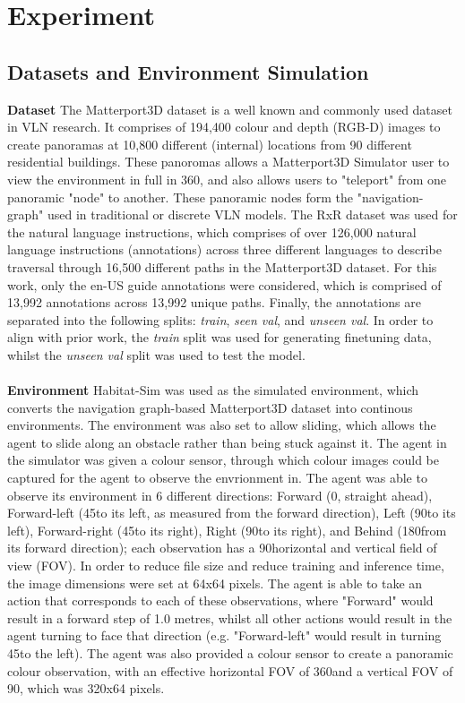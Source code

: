 \documentclass{svproc}
\begin{document}
\section{Experiment}
\subsection{Datasets and Environment Simulation}
    \textbf{Dataset}  The Matterport3D \cite{Matterport3D} dataset is a well known and commonly used dataset in VLN research. It comprises of 194,400 colour and depth (RGB-D) images to create panoramas at 10,800 different (internal) locations from 90 different residential buildings. These panoromas allows a Matterport3D Simulator user to view the environment in full in 360\textdegree, and also allows users to "teleport" from one panoramic "node" to another. These panoramic nodes form the "navigation-graph" used in traditional or discrete VLN models.
    The RxR dataset was used for the natural language instructions, which comprises of over 126,000 natural language instructions (annotations) across three different languages to describe traversal through 16,500 different paths in the Matterport3D dataset. For this work, only the en-US guide annotations were considered, which is comprised of 13,992 annotations across 13,992 unique paths. Finally, the annotations are separated into the following splits: \textit{train}, \textit{seen val}, and \textit{unseen val}. In order to align with prior work, the \textit{train} split was used for generating finetuning data, whilst the \textit{unseen val} split was used to test the model.
    \\ \\
    \textbf{Environment}  Habitat-Sim \cite{habitat19iccv, szot2021habitat, puig2023habitat3} was used as the simulated environment, which converts the navigation graph-based Matterport3D dataset into continous environments. The environment was also set to allow sliding, which allows the agent to slide along an obstacle rather than being stuck against it. The agent in the simulator was given a colour sensor, through which colour images could be captured for the agent to observe the envrionment in. The agent was able to observe its environment in 6 different directions: Forward (0\textdegree, straight ahead), Forward-left (45\textdegree to its left, as measured from the forward direction), Left (90\textdegree to its left), Forward-right (45\textdegree to its right), Right (90\textdegree to its right), and Behind (180\textdegree from its forward direction); each observation has a 90\textdegree horizontal and vertical field of view (FOV). In order to reduce file size and reduce training and inference time, the image dimensions were set at 64x64 pixels. The agent is able to take an action that corresponds to each of these observations, where "Forward" would result in a forward step of 1.0 metres, whilst all other actions would result in the agent turning to face that direction (e.g. "Forward-left" would result in turning 45\textdegree to the left). The agent was also provided a colour sensor to create a panoramic colour observation, with an effective horizontal FOV of 360\textdegree and a vertical FOV of 90\textdegree, which was 320x64 pixels.
\end{document}

